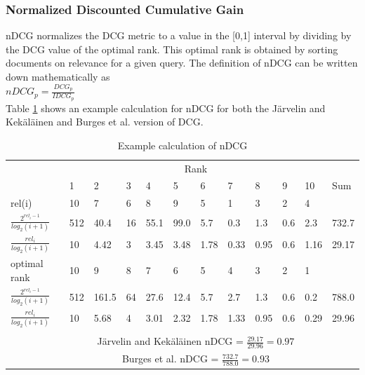 \subsubsection{Normalized Discounted Cumulative Gain}
\ac{nDCG} normalizes the \ac{DCG} metric to a value in the [0,1] interval by dividing by the \ac{DCG} value of the optimal rank. This optimal rank is obtained by sorting documents on relevance for a given query. The definition of \ac{nDCG} can be written down mathematically as\\

$nDCG_p = \frac{DCG_p}{IDCG_p}$\\

Table \ref{tab:example_calculation_nDCG} shows an example calculation for \ac{nDCG} for both the J{\"a}rvelin and Kek{\"a}l{\"a}inen \cite{Jarvelin2002} and Burges et al. \cite{Burges2005} version of \ac{DCG}.

\begin{table}[!h]
\begin{tabular}{llllllllllll}
 & \multicolumn{10}{c}{Rank} &  \\ 
\cline{2-11}
 & 1 & 2 & 3 & 4 & 5 & 6 & 7 & 8 & 9 & 10 & Sum \\ 
\hline
\hline
rel(i) & 10 & 7 & 6 & 8 & 9 & 5 & 1 & 3 & 2 & 4 &  \\
\hline
$\frac{2^{rel_i-1}}{log_2(i+1)}$ & 512 & 40.4 & 16 & 55.1 & 99.0 & 5.7 & 0.3 & 1.3 & 0.6 & 2.3 & 732.7 \\
\hline
$\frac{rel_i}{log_2(i+1)}$ & 10 & 4.42 & 3 & 3.45 & 3.48 & 1.78 & 0.33 & 0.95 & 0.6 & 1.16 & 29.17 \\  
\hline
\hline
optimal rank & 10 & 9 & 8 & 7 & 6 & 5 & 4 & 3 & 2 & 1 &  \\
\hline 
$\frac{2^{rel_i-1}}{log_2(i+1)}$ & 512 & 161.5 & 64 & 27.6 & 12.4 & 5.7 & 2.7 & 1.3 & 0.6 & 0.2 & 788.0 \\
\hline
$\frac{rel_i}{log_2(i+1)}$ & 10 & 5.68 & 4 & 3.01 & 2.32 & 1.78 & 1.33 & 0.95 & 0.6 & 0.29 & 29.96 \\   
\hline
 &  &  &  &  &  &  &  &  &  &  &  \\
 & \multicolumn{10}{c}{J{\"a}rvelin and Kek{\"a}l{\"a}inen \cite{Jarvelin2002} \ac{nDCG} = $\frac{29.17}{29.96} = 0.97$} &  \\  
 & \multicolumn{10}{c}{Burges \cite{Burges2005} et al. \ac{nDCG} = $\frac{732.7}{788.0} = 0.93$} &  \\ 
\end{tabular}
\caption{Example calculation of \acs{nDCG}}
\label{tab:example_calculation_nDCG}
\end{table}
